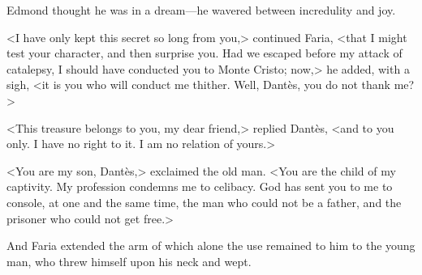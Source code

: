  Edmond thought he was in a dream—he wavered between incredulity and joy. 

 <I have only kept this secret so long from you,> continued Faria, <that I might test your character, and then surprise you. Had we escaped before my attack of catalepsy, I should have conducted you to Monte Cristo; now,> he added, with a sigh, <it is you who will conduct me thither. Well, Dantès, you do not thank me?> 

 <This treasure belongs to you, my dear friend,> replied Dantès, <and to you only. I have no right to it. I am no relation of yours.> 

 <You are my son, Dantès,> exclaimed the old man. <You are the child of my captivity. My profession condemns me to celibacy. God has sent you to me to console, at one and the same time, the man who could not be a father, and the prisoner who could not get free.> 

 And Faria extended the arm of which alone the use remained to him to the young man, who threw himself upon his neck and wept. 